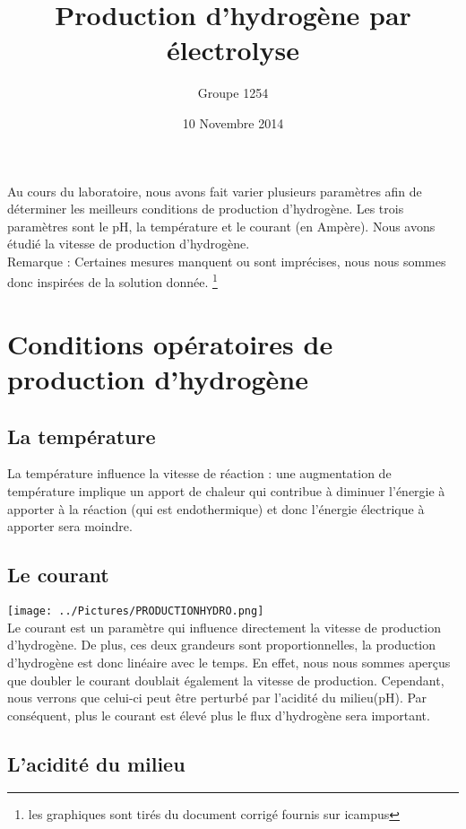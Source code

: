 \documentclass[10pt,a4paper]{article}
\title{Production d'hydrogène par électrolyse}
\author{Groupe 1254}
\date{10 Novembre 2014}
\begin{document}
\maketitle



Au cours du laboratoire, nous avons fait varier plusieurs paramètres afin de déterminer les meilleurs conditions de production d'hydrogène. Les trois paramètres sont le pH, la température et le courant (en Ampère). Nous avons étudié la vitesse de production d'hydrogène.
\\

Remarque : Certaines mesures manquent ou sont imprécises, nous nous sommes donc inspirées de la solution donnée. \footnote{les graphiques sont tirés du document corrigé fournis sur icampus}

\section{Conditions opératoires de production d'hydrogène}

\subsection{La température}

La température influence la vitesse de réaction : une augmentation de température implique un apport de chaleur qui contribue à diminuer l'énergie à apporter à la réaction (qui est endothermique) et donc l'énergie électrique à apporter sera moindre.



\subsection{Le courant}

\texttt{[image: ../Pictures/PRODUCTIONHYDRO.png]}
\\
  

Le courant est un paramètre qui influence directement la vitesse de production d'hydrogène. De plus, ces deux grandeurs sont proportionnelles, la production d'hydrogène est donc linéaire avec le temps. En effet, nous nous sommes aperçus que doubler le courant doublait également la vitesse de production. Cependant, nous verrons que celui-ci peut être perturbé par l'acidité du milieu(pH). Par conséquent, plus le courant est élevé plus le flux d'hydrogène sera important.


\subsection{L'acidité du milieu}
\end{document}

